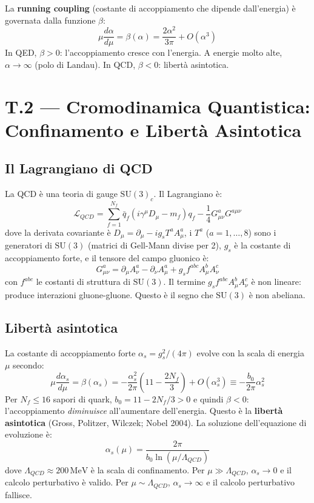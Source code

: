 \documentclass[11.5pt,a4paper,openany]{book}
\theoremstyle{remark}
\begin{document}
La \textbf{running coupling} (costante di accoppiamento che dipende dall'energia) è governata dalla funzione $\beta$:
\[
\mu \frac{d\alpha}{d\mu} = \beta(\alpha) = \frac{2\alpha^2}{3\pi} + O(\alpha^3)
\]
In QED, $\beta > 0$: l'accoppiamento cresce con l'energia. A energie molto alte, $\alpha \to \infty$ (polo di Landau). In QCD, $\beta < 0$: libertà asintotica.

\chapter*{T.2 — Cromodinamica Quantistica: Confinamento e Libertà Asintotica}

\section{Il Lagrangiano di QCD}

La QCD è una teoria di gauge $\mathrm{SU}(3)_c$. Il Lagrangiano è:
\[
\mathcal{L}_{QCD} = \sum_{f=1}^{N_f} \bar{q}_f (i\gamma^\mu D_\mu - m_f) q_f - \frac{1}{4} G^a_{\mu\nu} G^{a\mu\nu}
\]
dove la derivata covariante è $D_\mu = \partial_\mu - ig_s T^a A^a_\mu$, i $T^a$ ($a = 1, \ldots, 8$) sono i generatori di $\mathrm{SU}(3)$ (matrici di Gell-Mann divise per 2), $g_s$ è la costante di accoppiamento forte, e il tensore del campo gluonico è:
\[
G^a_{\mu\nu} = \partial_\mu A^a_\nu - \partial_\nu A^a_\mu + g_s f^{abc} A^b_\mu A^c_\nu
\]
con $f^{abc}$ le costanti di struttura di $\mathrm{SU}(3)$. Il termine $g_s f^{abc} A^b_\mu A^c_\nu$ è non lineare: produce interazioni gluone-gluone. Questo è il segno che $\mathrm{SU}(3)$ è non abeliana.

\section{Libertà asintotica}

La costante di accoppiamento forte $\alpha_s = g_s^2/(4\pi)$ evolve con la scala di energia $\mu$ secondo:
\[
\mu \frac{d\alpha_s}{d\mu} = \beta(\alpha_s) = -\frac{\alpha_s^2}{2\pi}\left(11 - \frac{2N_f}{3}\right) + O(\alpha_s^3) \equiv -\frac{b_0}{2\pi}\alpha_s^2
\]
Per $N_f \leq 16$ sapori di quark, $b_0 = 11 - 2N_f/3 > 0$ e quindi $\beta < 0$: l'accoppiamento \textit{diminuisce} all'aumentare dell'energia. Questo è la \textbf{libertà asintotica} (Gross, Politzer, Wilczek; Nobel 2004). La soluzione dell'equazione di evoluzione è:
\[
\alpha_s(\mu) = \frac{2\pi}{b_0 \ln(\mu/\Lambda_{QCD})}
\]
dove $\Lambda_{QCD} \approx 200\,\mathrm{MeV}$ è la scala di confinamento. Per $\mu \gg \Lambda_{QCD}$, $\alpha_s \to 0$ e il calcolo perturbativo è valido. Per $\mu \sim \Lambda_{QCD}$, $\alpha_s \to \infty$ e il calcolo perturbativo fallisce.
\end{document}
